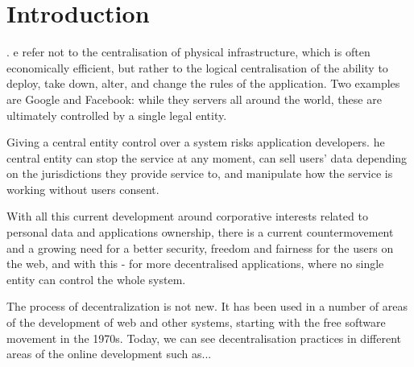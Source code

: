 \section{Introduction}\label{sec:intro}
. e refer not to the centralisation of physical infrastructure, which is often economically efficient, but rather to the logical centralisation of the ability to deploy, take down, alter, and change the rules of the application. Two  examples are  Google and Facebook: while they  servers all around the world, these are ultimately controlled by a single legal entity.

Giving a central entity control over a system  risks  application developers. he central entity can stop the service at any moment, can sell users' data  depending on the jurisdictions they provide service to, and manipulate how the service is working without  users consent.

{With all this current development around corporative interests related to personal data and applications ownership, there is a current countermovement and a growing need for a better security, freedom and fairness for the users on the web, and with this - for more decentralised applications, where no single entity can control the whole system.} 
    
 {The process of decentralization is not new. It has been used in a number of areas of the development of web and other systems, starting with the free software movement in the 1970s. Today, we can see decentralisation practices in different areas of the online development such as... } 

